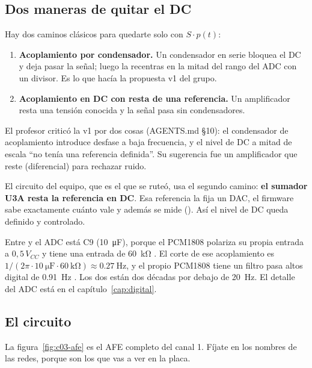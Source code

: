 \subsection{Dos maneras de quitar el DC}

Hay dos caminos clásicos para quedarte solo con $S\cdot p(t)$:
\begin{enumerate}
  \item \textbf{Acoplamiento por condensador.} Un condensador en serie bloquea el DC y deja pasar la señal; luego la
        recentras en la mitad del rango del ADC con un divisor. Es lo que hacía la propuesta v1 del grupo.
  \item \textbf{Acoplamiento en DC con resta de una referencia.} Un amplificador resta una tensión conocida y la
        señal pasa sin condensadores.
\end{enumerate}

El profesor criticó la v1 por dos cosas (AGENTS.md §10): el condensador de acoplamiento introduce desfase a baja
frecuencia, y el nivel de DC a mitad de escala ``no tenía una referencia definida''. Su sugerencia fue un
amplificador que reste (diferencial) para rechazar ruido.

El circuito del equipo, que es el que se ruteó, usa el segundo camino: \textbf{el sumador U3A resta la referencia
 en DC}. Esa referencia la fija un DAC, el firmware sabe exactamente cuánto vale y además se mide
(). Así el nivel de DC queda definido y controlado.

\begin{ojo}
Entre  y el ADC está C9 (\SI{10}{\micro\farad}), porque el PCM1808 polariza su propia entrada a
$0{,}5\,V_{CC}$ y tiene una entrada de \SI{60}{\kilo\ohm} . El corte de ese acoplamiento es
$1/(2\pi\cdot\SI{10}{\micro\farad}\cdot\SI{60}{\kilo\ohm}) \approx \SI{0.27}{\hertz}$, y el propio PCM1808 tiene un
filtro pasa altos digital de \SI{0.91}{\hertz} . Los dos están dos décadas por debajo de
\SI{20}{\hertz}. El detalle del ADC está en el capítulo~\ref{cap:digital}.
\end{ojo}

\subsection{El circuito}

La figura~\ref{fig:c03-afe} es el AFE completo del canal 1. Fíjate en los nombres de las redes, porque son los que
vas a ver en la placa.

